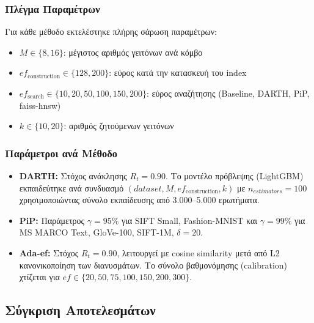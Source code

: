 \documentclass[12pt,a4paper]{article}
\begin{document}
\subsubsection{Πλέγμα Παραμέτρων}
Για κάθε μέθοδο εκτελέστηκε πλήρης σάρωση παραμέτρων:
\begin{itemize}
    \item $M \in \{8, 16\}$: μέγιστος αριθμός γειτόνων ανά κόμβο
    \item $ef_{\text{construction}} \in \{128, 200\}$: εύρος κατά την κατασκευή του index
    \item $ef_{\text{search}} \in \{10, 20, 50, 100, 150, 200\}$: εύρος αναζήτησης (Baseline, DARTH, PiP, faiss-hnsw)
    \item $k \in \{10, 20\}$: αριθμός ζητούμενων γειτόνων
\end{itemize}

\subsubsection{Παράμετροι ανά Μέθοδο}
\begin{itemize}
    \item \textbf{DARTH:} Στόχος ανάκλησης $R_t = 0.90$. Το μοντέλο πρόβλεψης (LightGBM) εκπαιδεύτηκε ανά συνδυασμό $(dataset, M, ef_{\text{construction}}, k)$ με $n_{estimators} = 100$ χρησιμοποιώντας σύνολο εκπαίδευσης από 3.000--5.000 ερωτήματα.
    \item \textbf{PiP:} Παράμετρος $\gamma = 95\%$ για SIFT Small, Fashion-MNIST και $\gamma = 99\%$ για MS MARCO Text, GloVe-100, SIFT-1M, $\delta = 20$.
    \item \textbf{Ada-ef:} Στόχος $R_t = 0.90$, λειτουργεί με cosine similarity μετά από L2 κανονικοποίηση των διανυσμάτων. Το σύνολο βαθμονόμησης (calibration) χτίζεται για $ef \in \{20, 50, 75, 100, 150, 200, 300\}$.
\end{itemize}

\subsection{Σύγκριση Αποτελεσμάτων}
\end{document}
